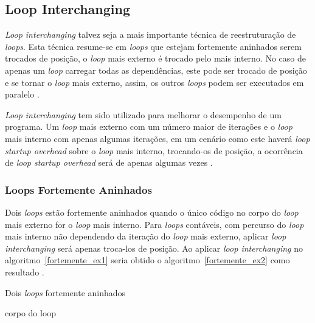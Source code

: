 \subsection{Loop Interchanging}

\textit{Loop interchanging} talvez seja a mais importante técnica de
reestruturação de \textit{loops}.
Esta técnica resume-se em \textit{loops} que estejam fortemente aninhados
serem trocados de posição, o \textit{loop} mais externo é trocado pelo mais
interno.
No caso de apenas um \textit{loop} carregar todas as dependências, este pode ser
trocado de posição e se tornar o \textit{loop} mais externo, assim, os outros
\textit{loops} podem ser executados em paralelo \cite{Ghodrat:2008}.

\textit{Loop interchanging} tem sido utilizado para melhorar o desempenho 
de um programa.
Um \textit{loop} mais externo com um número maior de iterações e o 
\textit{loop} mais interno com apenas algumas iterações, em um cenário como este
haverá \textit{loop startup overhead} sobre o \textit{loop} mais interno,
trocando-os de posição, a ocorrência de \textit{loop startup overhead} será de
apenas algumas vezes \cite{Allen:2004}.

\subsubsection{Loops Fortemente Aninhados}

Dois \textit{loops} estão fortemente aninhados quando o único código no corpo do
\textit{loop} mais externo for o \textit{loop} mais interno.
Para \textit{loops} contáveis, com percurso do \textit{loop} mais interno não
dependendo da iteração do \textit{loop} mais externo, aplicar \textit{loop
interchanging} será apenas troca-los de posição.
Ao aplicar \textit{loop interchanging} no algoritmo~\ref{fortemente_ex1}
seria obtido o algoritmo~\ref{fortemente_ex2} como resultado \cite{hpcfpc}.

\begin{algorithm}
\caption{Dois \textit{loops} fortemente aninhados}
\label{fortemente_ex1}
\begin{algorithmic}[1]

\STATE corpo do loop
\ENDFOR
\ENDFOR

\end{algorithmic}
\end{algorithm}


